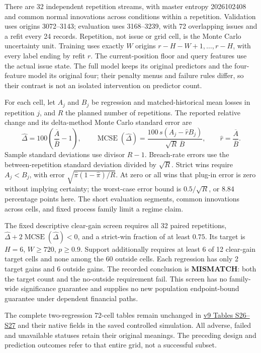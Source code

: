 \documentclass[12pt,a4paper]{article}
\begin{document}
There are 32 independent repetition streams, with master entropy 2026102408 and
common normal innovations across conditions within a repetition. Validation
uses origins 3072--3143; evaluation uses 3168--3239, with
72 overlapping issues and a refit every 24 records. Repetition, not
issue or grid cell, is the Monte Carlo uncertainty unit. Training uses exactly
\(W\) origins \(r-H-W+1,\ldots,r-H\), with every label ending by refit \(r\).
The current-position floor and query features use the actual issue state.
The full model keeps its original predictors and the four-feature model its
original four; their penalty menus and failure rules differ, so their contrast
is not an isolated intervention on predictor count.

For each cell, let \(A_j\) and \(B_j\) be regression and matched-historical mean losses in repetition \(j\), and \(R\) the planned number of repetitions. The
reported relative change and its delta-method Monte Carlo standard error are
\[
\widehat\Delta=100\left(\dfrac{\overline A}{\overline B}-1\right),\qquad
\operatorname{MCSE}(\widehat\Delta)=
\dfrac{100\,s(A_j-\widehat rB_j)}{\sqrt R\,\overline B},\qquad
\widehat r=\dfrac{\overline A}{\overline B}.
\]
Sample standard deviations use divisor \(R-1\). Breach-rate errors use the
between-repetition standard deviation divided by
\(\sqrt R\). Strict wins require \(A_j<B_j\), with error
\(\sqrt{\widehat\pi(1-\widehat\pi)/R}\). At zero or all wins that plug-in error is
zero without implying certainty; the worst-case error bound is
\(0.5/\sqrt R\), or 8.84 percentage points here. The short evaluation segments,
common innovations across cells, and fixed process family limit a regime claim.

The fixed descriptive clear-gain screen requires all 32 paired repetitions,
\(\widehat\Delta+2\operatorname{MCSE}(\widehat\Delta)<0\), and a strict-win fraction of at least \(0.75\). Its target is \(H=6\), \(W\ge 720\),
\(p\ge 0.9\). Support additionally requires at least 6 of 12
clear-gain target cells and none among the 60 outside cells. Each regression
has only 2 target gains and 6 outside gains. The recorded conclusion
is \textbf{MISMATCH}: both the target count and the no-outside requirement fail.
This screen has no family-wide significance guarantee and supplies no new
population endpoint-bound guarantee under dependent financial paths.

\begingroup
\renewcommand{\footnotesize}{\fontsize{9}{10.5}\selectfont}
The complete two-regression 72-cell tables remain unchanged in \href{https://github.com/ByronLi0207/financial-mathematics-paper-20261020/blob/0d2526cc69092c5158437a0509613bac5e86d47f/submission-jof/supplement.pdf}{v9 Tables S26--S27} and their native fields in the saved controlled simulation. All adverse, failed and unavailable statuses retain their original meanings. The preceding design and prediction outcomes refer to that entire grid, not a successful subset.
\endgroup
\end{document}
